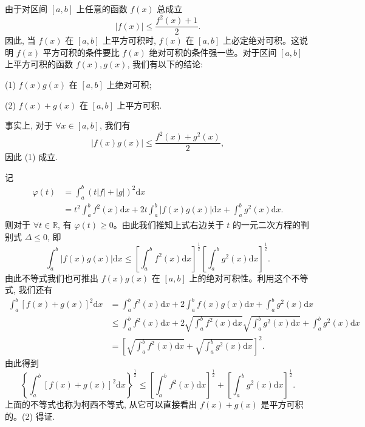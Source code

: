 由于对区间 $[a,b]$ 上任意的函数 $f(x)$ 总成立
\[
  |f(x)|\leqslant\frac{f^2(x)+1}{2}.
\]
因此, 当 $f(x)$ 在 $[a,b]$ 上平方可积时, $f(x)$ 在 $[a,b]$ 上必定绝对可积。这说明 $f(x)$ 平方可积的条件要比 $f(x)$ 绝对可积的条件强一些。对于区间 $[a,b]$ 上平方可积的函数 $f(x),g(x)$, 我们有以下的结论:

(1) $f(x)g(x)$ 在 $[a,b]$ 上绝对可积;

(2) $f(x)+g(x)$ 在 $[a,b]$ 上平方可积.

事实上, 对于 $\forall x\in[a,b]$, 我们有
\[
  |f(x)g(x)|\leqslant\frac{f^2(x)+g^2(x)}{2},
\]
因此 (1) 成立.

记
\[
\begin{aligned}
  \varphi(t)
  &=\int_a^b(t|f|+|g|)^2\mathrm dx\\
  &=t^2\int_a^bf^2(x)\mathrm dx
    +2t\int_a^b|f(x)g(x)|\mathrm dx
    +\int_a^bg^2(x)\mathrm dx.
\end{aligned}
\]
则对于 $\forall t\in\mathbb R$, 有 $\varphi(t)\geqslant0$。由此我们推知上式右边关于 $t$ 的一元二次方程的判别式 $\Delta\leqslant0$, 即
\[
  \int_a^b|f(x)g(x)|\mathrm dx
  \leqslant
  \left[\int_a^bf^2(x)\mathrm dx\right]^{\frac12}
  \left[\int_a^bg^2(x)\mathrm dx\right]^{\frac12}.
\]
由此不等式我们也可推出 $f(x)g(x)$ 在 $[a,b]$ 上的绝对可积性。利用这个不等式, 我们还有
\[
\begin{aligned}
  \int_a^b[f(x)+g(x)]^2\mathrm dx
  &=\int_a^bf^2(x)\mathrm dx+2\int_a^bf(x)g(x)\mathrm dx+\int_a^bg^2(x)\mathrm dx\\
  &\leqslant\int_a^bf^2(x)\mathrm dx
    +2\sqrt{\int_a^bf^2(x)\mathrm dx}\sqrt{\int_a^bg^2(x)\mathrm dx}
    +\int_a^bg^2(x)\mathrm dx\\
  &=\left[
    \sqrt{\int_a^bf^2(x)\mathrm dx}
    +\sqrt{\int_a^bg^2(x)\mathrm dx}
  \right]^2.
\end{aligned}
\]
由此得到
\[
  \left\{\int_a^b[f(x)+g(x)]^2\mathrm dx\right\}^{\frac12}
  \leqslant
  \left[\int_a^bf^2(x)\mathrm dx\right]^{\frac12}
  +
  \left[\int_a^bg^2(x)\mathrm dx\right]^{\frac12}.
\]
上面的不等式也称为柯西不等式, 从它可以直接看出 $f(x)+g(x)$ 是平方可积的。(2) 得证.

